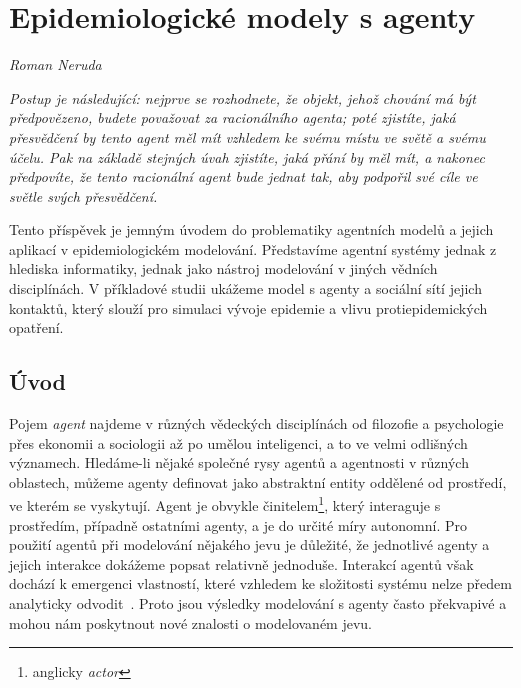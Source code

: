 
\chapter{Epidemiologické modely s agenty}\label{Modely_Agenty}
\label{Agentni_modely}
\textit{Roman Neruda}
\vspace{15mm}



 
\setlength{\epigraphrule}{0pt}
\setlength{\epigraphwidth}{.6\textwidth}
\epigraph{\textit{\flushepinormal
Postup je následující: nejprve se rozhodnete, že objekt, jehož chování má být předpovězeno, budete považovat za racionálního agenta; poté zjistíte, jaká přesvědčení by tento agent měl mít vzhledem ke svému místu ve světě a svému účelu. Pak na základě stejných úvah zjistíte, jaká přání by měl mít, a nakonec předpovíte, že tento racionální agent bude jednat tak, aby podpořil své cíle ve světle svých přesvědčení.}} 
{\cite{Dennett87}}


Tento příspěvek je jemným úvodem do problematiky agentních modelů a jejich aplikací v epidemiologickém modelování. Představíme agentní systémy jednak z hlediska informatiky, jednak jako nástroj modelování v jiných vědních disciplínách. V příkladové studii ukážeme model s agenty a sociální sítí jejich kontaktů, který slouží pro simulaci vývoje epidemie a vlivu protiepidemických opatření.

\section*{Úvod} 

Pojem \emph{agent} najdeme v různých vědeckých disciplínách od filozofie a psychologie přes ekonomii a sociologii až po umělou inteligenci, a to ve velmi odlišných významech. Hledáme-li nějaké společné rysy agentů a agentnosti v různých oblastech, můžeme agenty definovat jako abstraktní entity oddělené od prostředí, ve kterém se vyskytují. Agent je obvykle činitelem\footnote{anglicky \emph{actor}}, který interaguje s prostředím, případně ostatními agenty, a je do určité míry autonomní. Pro použití agentů při modelování nějakého jevu je důležité, že jednotlivé agenty a jejich interakce dokážeme popsat relativně jednoduše. Interakcí agentů však dochází k emergenci vlastností, které vzhledem ke složitosti systému nelze předem analyticky odvodit~\cite{Symons18}. Proto jsou výsledky modelování s agenty často překvapivé a mohou nám poskytnout nové znalosti o modelovaném jevu. 

